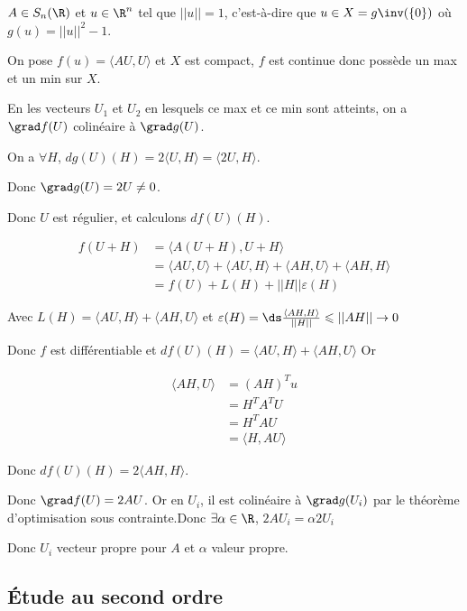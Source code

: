 \begin{exemple}
    $A \in S_n(\R)$ et $u \in \R^n$ tel que $||u|| = 1$, c'est-à-dire que $u \in X = g\inv (\{0\})$ où 
    $g(u) = ||u||^2 - 1$.

    On pose $f(u) = \langle AU , U \rangle$ et $X$ est compact, $f$ est continue donc possède un max 
    et un min sur $X$. 

    En les vecteurs $U_1$ et $U_2$ en lesquels ce max et ce min sont atteints, on a 
    $\grad f(U)$ colinéaire à $\grad g(U)$. 

    On a $\forall H$, $dg(U)(H) = 2 \langle U , H \rangle = \langle 2 U , H \rangle$.

    Donc $\grad g (U) = 2 U \neq 0$. 

    Donc $U$ est régulier, et calculons $df(U)(H)$. 

    \begin{align}
        f(U + H) & = \langle A(U + H), U + H \rangle \\
        & = \langle AU, U \rangle + \langle AU, H \rangle + \langle AH, U \rangle + \langle AH, H \rangle \\
        & = f(U) + L(H) + ||H|| \varepsilon(H)
    \end{align}

    Avec $L(H) = \langle AU, H \rangle + \langle AH, U \rangle$ et $\varepsilon(H) = \ds \frac{\langle AH, H \rangle }{ || H||} \leqslant ||AH|| \to 0$

    Donc $f$ est différentiable et $df(U)(H) = \langle AU, H \rangle + \langle AH, U \rangle$
    Or 

    \begin{align}
        \langle AH, U \rangle & = (AH)^T u \\
        & = H^T A^T U \\
        & = H^T AU \\
        & = \langle H, AU \rangle 
    \end{align}

    Donc $df(U)(H) = 2 \langle AH, H \rangle$. 

    Donc $\grad f (U) = 2 AU$. Or en $U_i$, il est colinéaire à $\grad g (U_i)$ par 
    le théorème d'optimisation sous contrainte.Donc $\exists \alpha \in \R$, $2AU_i =  \alpha 2 U_i$

    Donc $U_i$ vecteur propre pour $A$ et $\alpha$ valeur propre. 
\end{exemple}


\subsection{\'Etude au second ordre}

